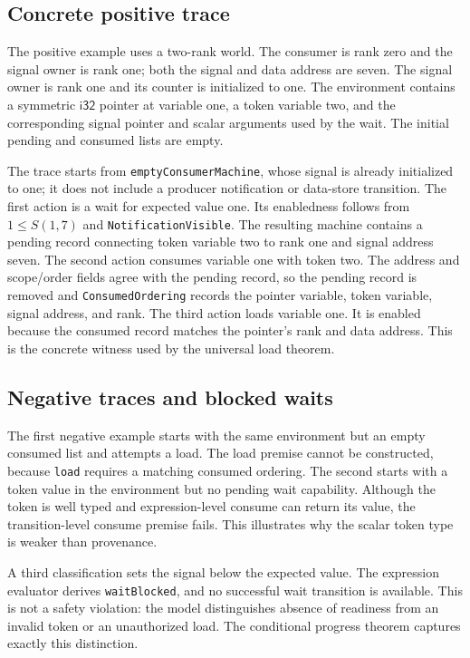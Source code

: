\documentclass[a4paper,USenglish]{lipics-v2021}
\begin{document}
\subsection{Concrete positive trace}
The positive example uses a two-rank world. The consumer is rank zero and the
signal owner is rank one; both
the signal and data address are seven. The signal owner is rank one and its
counter is initialized to one. The environment contains a
symmetric \(\mathsf{i32}\) pointer at variable one, a token variable two, and
the corresponding signal pointer and scalar arguments used by the wait. The
initial pending and consumed lists are empty.

The trace starts from \texttt{emptyConsumerMachine}, whose signal is already
initialized to one; it does not include a producer notification or data-store
transition. The first action is a wait for expected value one. Its enabledness
follows from \(1\leq S(1,7)\) and \texttt{NotificationVisible}. The resulting
machine contains a pending record connecting token variable two to rank one
and signal address seven. The second action consumes variable one with token two.
The address and scope/order fields agree with the pending record, so the
pending record is removed and \texttt{ConsumedOrdering} records the pointer
variable, token variable, signal address, and rank. The third action loads
variable one. It is enabled because the consumed record matches the pointer's
rank and data address. This is the concrete witness used by the universal load
theorem.

\subsection{Negative traces and blocked waits}
The first negative example starts with the same environment but an empty
consumed list and attempts a load. The load premise cannot be constructed,
because \texttt{load} requires a matching consumed ordering. The second starts
with a token value in the environment but no pending wait capability. Although
the token is well typed and expression-level consume can return its value, the
transition-level consume premise fails. This illustrates why the scalar token
type is weaker than provenance.

A third classification sets the signal below the expected value. The
expression evaluator derives \texttt{waitBlocked}, and no successful wait
transition is available. This is not a safety violation: the model distinguishes
absence of readiness from an invalid token or an unauthorized load. The
conditional progress theorem captures exactly this distinction.
\end{document}
